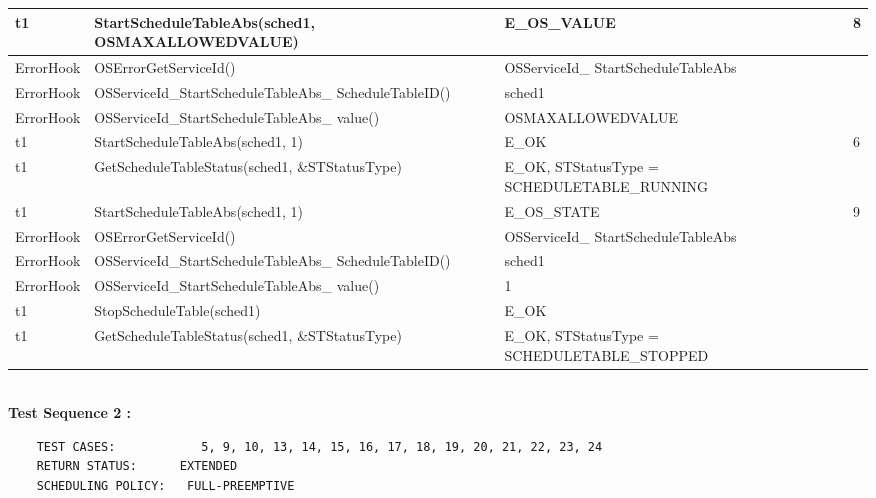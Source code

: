 \documentclass[10pt]{article}
\newlength{\Li}\settowidth{\Li}{Running}
\newlength{\Lii}\setlength{\Lii}{7cm}
\newlength{\Liiii}\setlength{\Liiii}{0.9cm}
\newlength{\Liii}\setlength{\Liii}{\textwidth} \addtolength{\Liii}{-\Li} \addtolength{\Liii}{-\Lii} \addtolength{\Liii}{-\Liiii}
\begin{document}
\begin{supertabular}{|p{\Li}|p{\Lii}|p{\Liii}|p{\Liiii}|}
	t1	& StartScheduleTableAbs(sched1, OSMAXALLOWEDVALUE)					& E\_OS\_VALUE										& 8 \\ \hline
	ErrorHook	& OSErrorGetServiceId()											& OSServiceId\_ StartScheduleTableAbs						& \\ \hline
	ErrorHook	& OSServiceId\_StartScheduleTableAbs\_ ScheduleTableID()				& sched1												& \\ \hline
	ErrorHook	& OSServiceId\_StartScheduleTableAbs\_ value()						& OSMAXALLOWEDVALUE								& \\ \hline
	
	t1	& StartScheduleTableAbs(sched1, 1)									& E\_OK												& 6 \\ \hline
	t1	& GetScheduleTableStatus(sched1, \&STStatusType)						& E\_OK, STStatusType = SCHEDULETABLE\_RUNNING		& \\ \hline
	t1	& StartScheduleTableAbs(sched1, 1)									& E\_OS\_STATE										& 9 \\ \hline
	ErrorHook	& OSErrorGetServiceId()											& OSServiceId\_ StartScheduleTableAbs						& \\ \hline
	ErrorHook	& OSServiceId\_StartScheduleTableAbs\_ ScheduleTableID()				& sched1												& \\ \hline
	ErrorHook	& OSServiceId\_StartScheduleTableAbs\_ value()						& 1													& \\ \hline
	
	t1	& StopScheduleTable(sched1)											& E\_OK												& \\ \hline
	t1	& GetScheduleTableStatus(sched1, \&STStatusType)						& E\_OK, STStatusType = SCHEDULETABLE\_STOPPED		& \\ \hline
	\end{supertabular}\\

	
	\textbf{Test Sequence 2 :}
	\begin{lstlisting}
	TEST CASES:		       5, 9, 10, 13, 14, 15, 16, 17, 18, 19, 20, 21, 22, 23, 24
	RETURN STATUS:	  	EXTENDED
	SCHEDULING POLICY:   FULL-PREEMPTIVE
	\end{lstlisting}
	
	
\end{document}
